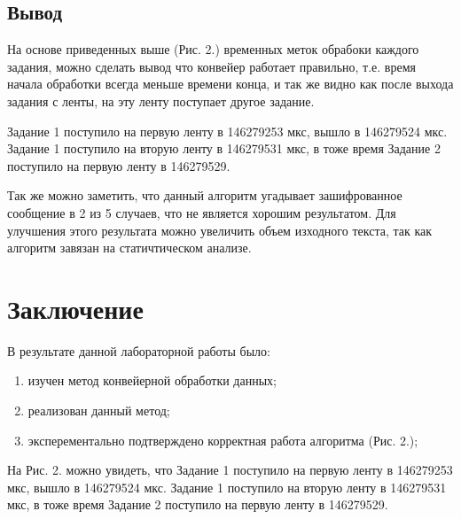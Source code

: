 \documentclass[12pt]{report}
\begin{document}
	\section*{Вывод}
	
	На основе приведенных выше (Рис. 2.) временных меток обрабоки каждого задания, можно сделать вывод что конвейер работает правильно, т.е. время начала обработки всегда меньше времени конца, и так же видно как после выхода задания с ленты, на эту ленту поступает другое задание.
	
	Задание 1 поступило на первую ленту в 146279253 мкс, вышло в 146279524 мкс.
	Задание 1 поступило на вторую ленту в 146279531 мкс, в тоже время Задание 2 поступило на первую ленту в 146279529.
	
	Так же можно заметить, что данный алгоритм угадывает зашифрованное сообщение в 2 из 5 случаев, что не является хорошим результатом.
	Для улучшения этого результата можно увеличить объем изходного текста, так как алгоритм завязан на статичтическом анализе.
	
	\chapter*{Заключение}
	
	В результате данной лабораторной работы было:
	\begin{enumerate}
		\item изучен метод конвейерной обработки данных;
		\item реализован данный метод;
		\item эксперементально подтверждено корректная работа алгоритма (Рис. 2.);
	\end{enumerate}

	На Рис. 2. можно увидеть, что Задание 1 поступило на первую ленту в 146279253 мкс, вышло в 146279524 мкс.
	Задание 1 поступило на вторую ленту в 146279531 мкс, в тоже время Задание 2 поступило на первую ленту в 146279529.
\end{document}
